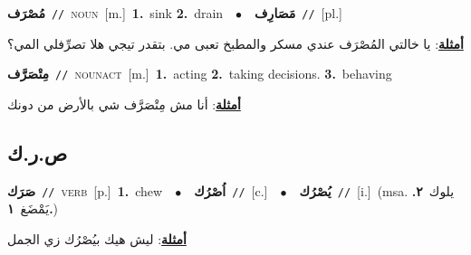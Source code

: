 \documentclass[10pt,a4paper,twoside]{article} %
\begin{document}
\begin{multicols}{2}
{\setlength\topsep{0pt}\textbf{\foreignlanguage{arabic}{مُصْرَف}}\ {\color{gray}\texttt{//}\color{black}}\ \textsc{noun}\ [m.]\ \textbf{1.}~sink  \textbf{2.}~drain\ \ $\bullet$\ \ \setlength\topsep{0pt}\textbf{\foreignlanguage{arabic}{مَصَارِف}}\ {\color{gray}\texttt{//}\color{black}}\ [pl.]\  \begin{flushright}\color{gray}\foreignlanguage{arabic}{\textbf{\underline{\foreignlanguage{arabic}{أمثلة}}}: يا خالتي المُصْرَف عندي مسكر والمطبخ تعبى مي. بتقدر تيجي هلا تصرِّفلي المي؟}\end{flushright}\color{black}} \vspace{2mm}

{\setlength\topsep{0pt}\textbf{\foreignlanguage{arabic}{مِتْصَرَّف}}\ {\color{gray}\texttt{//}\color{black}}\ \textsc{noun\textunderscore act}\ [m.]\ \textbf{1.}~acting  \textbf{2.}~taking decisions.  \textbf{3.}~behaving\  \begin{flushright}\color{gray}\foreignlanguage{arabic}{\textbf{\underline{\foreignlanguage{arabic}{أمثلة}}}: أنا مش مِتْصَرَّف شي بالأرض من دونك}\end{flushright}\color{black}} \vspace{2mm}

\vspace{-3mm}
\subsection*{\color{blue}\foreignlanguage{arabic}{ص.ر.ك}\color{blue}{}} 

{\setlength\topsep{0pt}\textbf{\foreignlanguage{arabic}{صَرَك}}\ {\color{gray}\texttt{//}\color{black}}\ \textsc{verb}\ [p.]\ \textbf{1.}~chew\ \ $\bullet$\ \ \setlength\topsep{0pt}\textbf{\foreignlanguage{arabic}{اُصْرُك}}\ {\color{gray}\texttt{//}\color{black}}\ [c.]\ \ $\bullet$\ \ \setlength\topsep{0pt}\textbf{\foreignlanguage{arabic}{يُصْرُك}}\ {\color{gray}\texttt{//}\color{black}}\ [i.]\ \color{gray}(msa. \foreignlanguage{arabic}{يلوك}~\foreignlanguage{arabic}{\textbf{٢.}}  \foreignlanguage{arabic}{يَمْضَغ}~\foreignlanguage{arabic}{\textbf{١.}})\color{black}\  \begin{flushright}\color{gray}\foreignlanguage{arabic}{\textbf{\underline{\foreignlanguage{arabic}{أمثلة}}}: ليش هيك بيُصْرُك زي الجمل}\end{flushright}\color{black}} \vspace{2mm}


\end{multicols}
\end{document}
